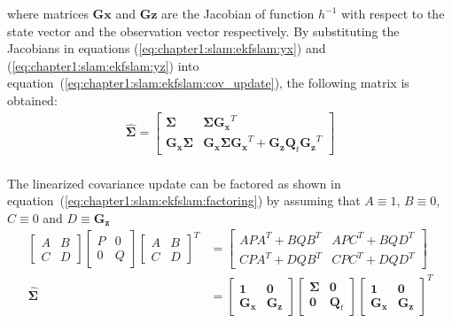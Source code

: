 where matrices $\mathbf{Gx}$ and $\mathbf{Gz}$ are the Jacobian of function $h^{-1}$ with respect to the state vector and the observation vector respectively. By substituting the Jacobians in equations (\ref{eq:chapter1:slam:ekfslam:yx}) and (\ref{eq:chapter1:slam:ekfslam:yz}) into equation~(\ref{eq:chapter1:slam:ekfslam:cov_update}), the following matrix is obtained:
\begin{align}
    \mathbf{\hat{\Sigma}} = \begin{bmatrix}
        \mathbf{\Sigma} & \mathbf{\Sigma} \mathbf{G_x}^T \\
        \mathbf{G_x} \mathbf{\Sigma} & \mathbf{G_x} \mathbf{\Sigma} \mathbf{G_x}^T + \mathbf{G_z} \mathbf{Q}_t \mathbf{G_z}^T
    \end{bmatrix}
    \label{eq:chapter1:slam:ekfslam:cov_update_full}
\end{align}\\

The linearized covariance update can be factored as shown in equation~(\ref{eq:chapter1:slam:ekfslam:factoring}) by assuming that $A \equiv 1$, $B \equiv 0$, $C \equiv 0$ and $D \equiv \mathbf{G_z}$
\begin{align}
    \begin{bmatrix}
        A & B \\ C & D
    \end{bmatrix} \begin{bmatrix}
        P & 0 \\ 0 & Q
    \end{bmatrix} \begin{bmatrix}
        A & B \\ C & D
    \end{bmatrix}^T &= \begin{bmatrix}
            APA^T + BQB^T & APC^T + BQD^T \\
            CPA^T + DQB^T & CPC^T + DQD^T
    \end{bmatrix}
    \label{eq:chapter1:slam:ekfslam:factoring}\\
    \mathbf{\hat\Sigma} &= \begin{bmatrix}
        \mathbf{1} & \mathbf{0} \\ \mathbf{G_x} & \mathbf{G_z}
    \end{bmatrix} \begin{bmatrix}
        \mathbf{\Sigma} & \mathbf{0} \\ \mathbf{0} & \mathbf{Q}_t
    \end{bmatrix} \begin{bmatrix}
        \mathbf{1} & \mathbf{0} \\ \mathbf{G_x} & \mathbf{G_z}
    \end{bmatrix}^T
    \label{eq:chapter1:slam:ekfslam:factored_cov_update}\\
\end{align}
